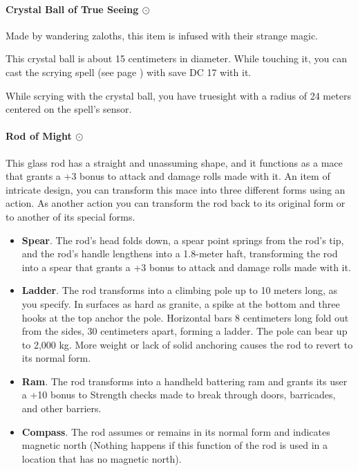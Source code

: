 \paragraph{Crystal Ball of True Seeing $\odot$}
    Made by wandering zaloths, this item is infused with their strange magic.

    This crystal ball is about 15 centimeters in diameter.
    While touching it, you can cast the scrying spell (see page \pageref{spell::scrying}) with save DC 17 with it.

    While scrying with the crystal ball, you have truesight with a radius of 24 meters centered on the spell's sensor.
\paragraph{Rod of Might $\odot$}
    This glass rod has a straight and unassuming shape, and it functions as a mace that grants a +3 bonus to attack and damage rolls made with it.
    An item of intricate design, you can transform this mace into three different forms using an action.
    As another action you can transform the rod back to its original form or to another of its special forms.
    \begin{itemize}
        \item \textbf{Spear}.
        The rod's head folds down, a spear point springs from the rod's tip, and the rod's handle lengthens into a 1.8-meter haft, transforming the rod into a spear that grants a +3 bonus to attack and damage rolls made with it.
        \item \textbf{Ladder}.
        The rod transforms into a climbing pole up to 10 meters long, as you specify.
        In surfaces as hard as granite, a spike at the bottom and three hooks at the top anchor the pole.
        Horizontal bars 8 centimeters long fold out from the sides, 30 centimeters apart, forming a ladder.
        The pole can bear up to 2,000 kg.
        More weight or lack of solid anchoring causes the rod to revert to its normal form.
        \item \textbf{Ram}.
        The rod transforms into a handheld battering ram and grants its user a +10 bonus to Strength checks made to break through doors, barricades, and other barriers.
        \item \textbf{Compass}.
        The rod assumes or remains in its normal form and indicates magnetic north (Nothing happens if this function of the rod is used in a location that has no magnetic north).
    \end{itemize}

